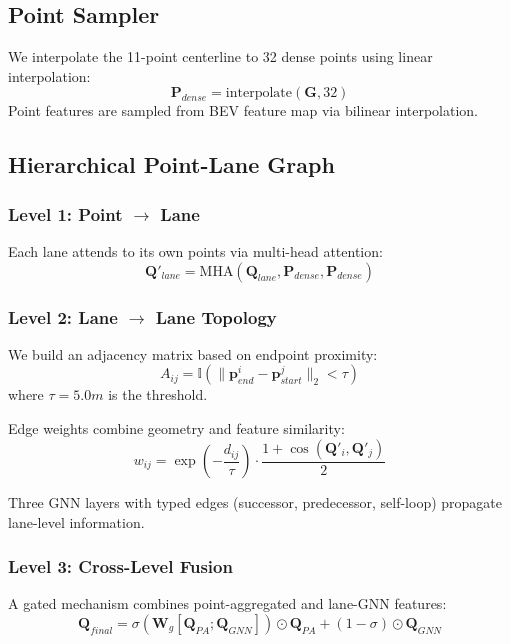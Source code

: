\documentclass[conference, a4paper, 10pt]{IEEEtran}
\newcommand{\bm}[1]{\mathbf{#1}}
\begin{document}
\subsection{Point Sampler}
We interpolate the 11-point centerline to 32 dense points using linear interpolation:
\begin{equation}
    \bm{P}_{dense} = \text{interpolate}(\bm{G}, 32)
\end{equation}
Point features are sampled from BEV feature map via bilinear interpolation.

\subsection{Hierarchical Point-Lane Graph}

\subsubsection{Level 1: Point $\rightarrow$ Lane}
Each lane attends to its own points via multi-head attention:
\begin{equation}
    \bm{Q}'_{lane} = \text{MHA}(\bm{Q}_{lane}, \bm{P}_{dense}, \bm{P}_{dense})
\end{equation}

\subsubsection{Level 2: Lane $\rightarrow$ Lane Topology}
We build an adjacency matrix based on endpoint proximity:
\begin{equation}
    A_{ij} = \mathbb{I}\left( \| \bm{p}_{end}^i - \bm{p}_{start}^j \|_2 < \tau \right)
\end{equation}
where $\tau = 5.0m$ is the threshold.

Edge weights combine geometry and feature similarity:
\begin{equation}
    w_{ij} = \exp\left(-\frac{d_{ij}}{\tau}\right) \cdot \frac{1 + \cos(\bm{Q}'_i, \bm{Q}'_j)}{2}
\end{equation}

Three GNN layers with typed edges (successor, predecessor, self-loop) propagate lane-level information.

\subsubsection{Level 3: Cross-Level Fusion}
A gated mechanism combines point-aggregated and lane-GNN features:
\begin{equation}
    \bm{Q}_{final} = \sigma(\bm{W}_g[\bm{Q}_{PA}; \bm{Q}_{GNN}]) \odot \bm{Q}_{PA} + (1-\sigma) \odot \bm{Q}_{GNN}
\end{equation}
\end{document}
